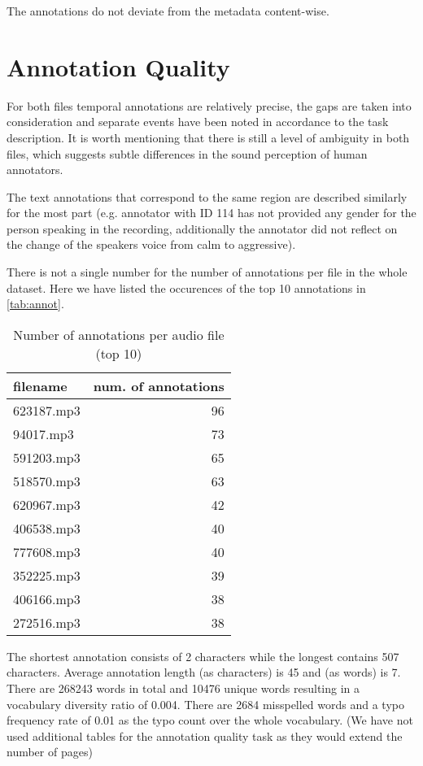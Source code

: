 \documentclass{article}
\begin{document}
The annotations do not deviate from the metadata content-wise.

\section{Annotation Quality}
\label{sec:headings}

For both files temporal annotations are relatively precise, the gaps are taken into consideration and separate events have been noted in accordance to the task description. It is worth mentioning that there is still a level of ambiguity in both files, which suggests subtle differences in the sound perception of human annotators.

The text annotations that correspond to the
same region are described similarly for the most part (e.g. annotator with ID 114 has not provided any gender for the person speaking in the recording, additionally the annotator did not reflect on the change of the speakers voice from calm to aggressive).

There is not a single number for the number of annotations per file in the whole dataset. Here we have listed the occurences of the top 10 annotations in \autoref{tab:annot}.

\begin{table}
  \caption{Number of annotations per audio file (top 10)}
  \label{tab:annot}
  \centering
  \begin{tabular}{lr}
    \toprule
    filename & num. of annotations \\
    \midrule
    623187.mp3 & 96 \\
    94017.mp3  & 73 \\
    591203.mp3 & 65 \\
    518570.mp3 & 63 \\
    620967.mp3 & 42 \\
    406538.mp3 & 40 \\
    777608.mp3 & 40 \\
    352225.mp3 & 39 \\
    406166.mp3 & 38 \\
    272516.mp3 & 38 \\
    \bottomrule
  \end{tabular}
\end{table}

The shortest annotation consists of 2 characters while the longest contains 507 characters. Average annotation length (as characters) is 45 and (as words) is 7. There are 268243 words in total and 10476 unique words resulting in a vocabulary diversity ratio of 0.004.
There are 2684 misspelled words and a typo frequency rate of 0.01 as the typo count over the whole vocabulary. (We have not used additional tables for the annotation quality task as they would extend the number of pages)
\end{document}
